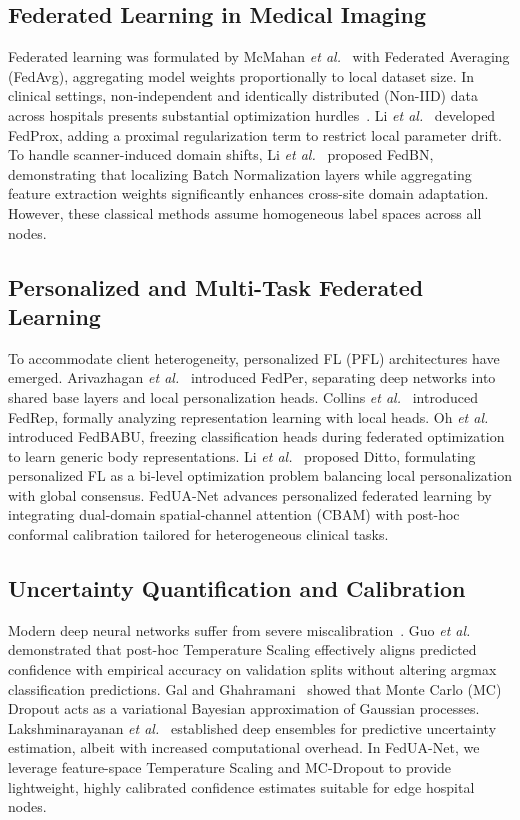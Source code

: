 \documentclass[journal]{IEEEtran}
\begin{document}
\subsection{Federated Learning in Medical Imaging}
Federated learning was formulated by McMahan \textit{et al.}~\cite{mcmahan2017communication} with Federated Averaging (FedAvg), aggregating model weights proportionally to local dataset size. In clinical settings, non-independent and identically distributed (Non-IID) data across hospitals presents substantial optimization hurdles~\cite{kairouz2021advances}. Li \textit{et al.}~\cite{li2020federated} developed FedProx, adding a proximal regularization term to restrict local parameter drift. To handle scanner-induced domain shifts, Li \textit{et al.}~\cite{li2021fedbn} proposed FedBN, demonstrating that localizing Batch Normalization layers while aggregating feature extraction weights significantly enhances cross-site domain adaptation. However, these classical methods assume homogeneous label spaces across all nodes.

\subsection{Personalized and Multi-Task Federated Learning}
To accommodate client heterogeneity, personalized FL (PFL) architectures have emerged. Arivazhagan \textit{et al.}~\cite{arivazhagan2019federated} introduced FedPer, separating deep networks into shared base layers and local personalization heads. Collins \textit{et al.}~\cite{collins2021fedrep} introduced FedRep, formally analyzing representation learning with local heads. Oh \textit{et al.}~\cite{oh2022fedbabu} introduced FedBABU, freezing classification heads during federated optimization to learn generic body representations. Li \textit{et al.}~\cite{li2021ditto} proposed Ditto, formulating personalized FL as a bi-level optimization problem balancing local personalization with global consensus. FedUA-Net advances personalized federated learning by integrating dual-domain spatial-channel attention (CBAM) with post-hoc conformal calibration tailored for heterogeneous clinical tasks.

\subsection{Uncertainty Quantification and Calibration}
Modern deep neural networks suffer from severe miscalibration~\cite{guo2017calibration}. Guo \textit{et al.}~\cite{guo2017calibration} demonstrated that post-hoc Temperature Scaling effectively aligns predicted confidence with empirical accuracy on validation splits without altering argmax classification predictions. Gal and Ghahramani~\cite{gal2016dropout} showed that Monte Carlo (MC) Dropout acts as a variational Bayesian approximation of Gaussian processes. Lakshminarayanan \textit{et al.}~\cite{lakshminarayanan2017simple} established deep ensembles for predictive uncertainty estimation, albeit with increased computational overhead. In FedUA-Net, we leverage feature-space Temperature Scaling and MC-Dropout to provide lightweight, highly calibrated confidence estimates suitable for edge hospital nodes.
\end{document}
